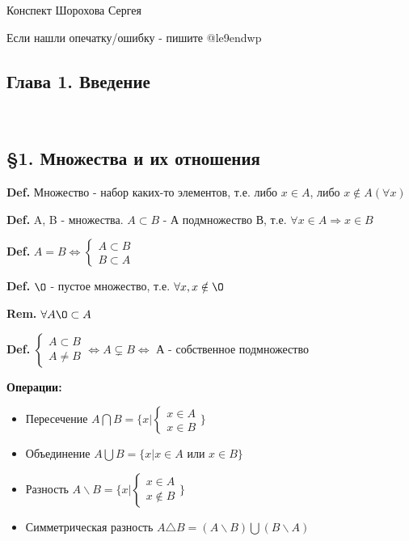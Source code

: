 \documentclass[14pt, letter paper]{article}
\begin{document}
\begin{flushright}
    Конспект Шорохова Сергея

    Если нашли опечатку/ошибку - пишите @le9endwp
\end{flushright}

\begin{center}
\section*{Глава 1. Введение} \\
\subsection*{\S 1. Множества и их отношения}
\end{center}


\textbf{Def.} Множество - набор каких-то элементов, т.е. либо $x \in A$, либо $x \notin A (\forall x)$

\textbf{Def.} A, B - множества. $A \subset B$ - А подмножество В, т.е. $\forall x \in A \Rightarrow x \in B$

\textbf{Def.} $A = B \Leftrightarrow \begin{cases} A \subset B \\ B \subset A \end{cases}$

\textbf{Def.} $\O$ - пустое множество, т.е. $\forall x, x \notin \O$

\textbf{Rem.} $\forall A \O \subset A$

\textbf{Def.} $\begin{cases} A \subset B \\ A \neq B \end{cases} \Leftrightarrow A \subsetneq B \Leftrightarrow$ А - собственное подмножество

\textbf{Операции:}
\begin{itemize}
    \item Пересечение $A \bigcap B = \{ x | \begin{cases} x \in A \\ x \in B \end{cases} \}$
    \item Объединение $A \bigcup B = \{x | x \in A$ или $x \in B \}$
    \item Разность $A \backslash B = \{x | \begin{cases} x \in A \\ x \notin B \end{cases} \}$
    \item Симметрическая разность $A \triangle B = (A \backslash B) \bigcup (B \backslash A)$
\end{itemize}
\end{document}

